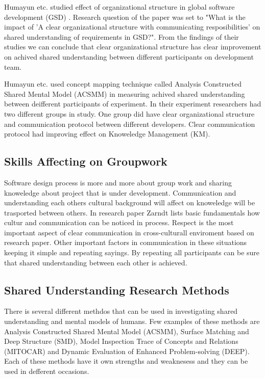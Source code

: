\documentclass[english]{tktltiki2}
\theoremstyle{definition}
\theoremstyle{remark}
\begin{document}
Humayun etc. studied effect of organizational structure in global software development (GSD) \cite{organizationalStructure}. Research question of the paper was set to "What is the impact of 'A clear organizational structure with communicating resposibilities' on shared understanding of requirements in GSD?". From the findings of their studies we can conclude that clear organizational structure has clear improvement on achived shared understanding between different participants on development team.

Humayun etc. used concept mapping technique called Analysis Constructed Shared Mental Model (ACSMM) in measuring achived shared understanding between deifferent participants of experiment. In their experiment researchers had two different groups in study. One group did have clear organizational structure and communication protocol between different developers. Clear communication protocol had improving effect on Knoweledge Management (KM)\cite{organizationalStructure}.

\subsection{Skills Affecting on Groupwork}

Software design process is more and more about group work and sharing knoweledge about project that is under development. Communication and understanding each others cultural background will affect on knoweledge will be trasported between others. In research paper Zarndt lists basic fundamentals how cultur and communication can be noticed in process\cite{culturalCommunication}. Respect is the most important aspect of clear communication in cross-culturall enviroment based on research paper. Other important factors in communication in these situations keeping it simple and repeating sayings. By repeating all participants can be sure that shared understanding between each other is achieved\cite{culturalCommunication}.

\subsection{Shared Understanding Research Methods}

There is several different methdos that can be used in investigating shared understanding and mental models of humans. Few examples of these methods are Analysis Constructed Shared Mental Model (ACSMM), Surface Matching and Deep Structure (SMD), Model Inspection Trace of Concepts and Relations (MITOCAR) and Dynamic Evaluation of Enhanced Problem-solving (DEEP). Each of these methods have it own strengths and weaknesess and they can be used in defferent occasions\cite{mentalModelResearch}.
\end{document}
